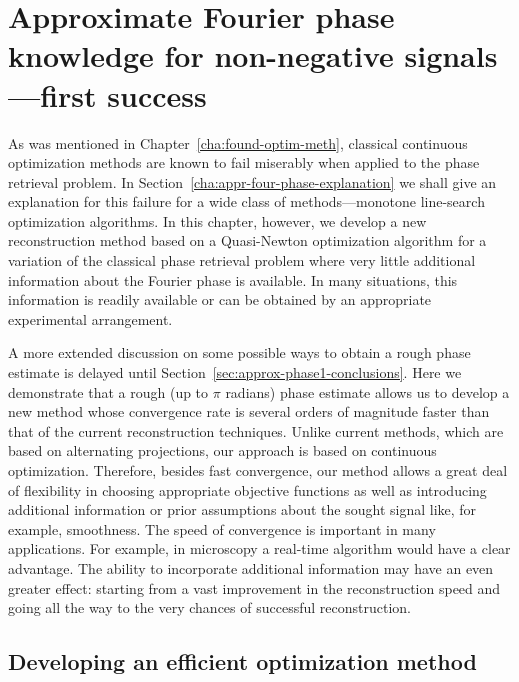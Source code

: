 \chapter{Approximate Fourier phase knowledge for non-negative
  signals---first success\footnotemark}
\label{cha:appr-four-phase-first}


As was mentioned in Chapter~\ref{cha:found-optim-meth}, classical
continuous optimization
methods are known to fail miserably when applied to the phase
retrieval problem. In Section~\ref{cha:appr-four-phase-explanation} we
shall give an explanation for this failure for a wide class of
methods---monotone line-search optimization algorithms. In this
chapter, however, we develop a new reconstruction method based on a
Quasi-Newton optimization algorithm for a variation of the classical
phase retrieval problem where very little additional information about the
Fourier phase is available. In many situations, this information is
readily available or can be obtained by an appropriate experimental
arrangement.

A more extended discussion on some possible ways to obtain a rough
phase estimate is delayed until
Section~\ref{sec:approx-phase1-conclusions}. Here we demonstrate that
a rough (up to $\pi$ radians) phase estimate allows us to develop a
new method whose convergence rate is several orders of magnitude
faster than that of the current reconstruction techniques. Unlike
current methods, which are based on alternating projections, our
approach is based on continuous optimization. Therefore, besides fast
convergence, our method allows a great deal of flexibility in choosing
appropriate objective functions as well as introducing additional
information or prior assumptions about the sought signal like, for
example, smoothness. The speed of
convergence is important in many applications. For example, in microscopy a
real-time algorithm would have a clear advantage. The ability to
incorporate additional information may have an even greater effect: starting
from a vast improvement in the reconstruction speed and going all the
way to the very chances of successful reconstruction.


\section{Developing an efficient optimization method}
\label{sec:approx-phase1-devel-cont-optim}

